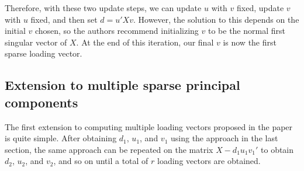 \documentclass[11pt]{article}
\begin{document}
Therefore, with these two update steps, we can update $u$ with $v$ fixed, update $v$ with $u$ fixed, and then set $d = u'Xv$. However, the solution to this depends on the initial $v$ chosen, so the authors recommend initializing $v$ to be the normal first singular vector of $X$. At the end of this iteration, our final $v$ is now the first sparse loading vector.

\subsection{Extension to multiple sparse principal components}
The first extension to computing multiple loading vectors proposed in the paper is quite simple. After obtaining $d_1$, $u_1$, and $v_1$ using the approach in the last section, the same approach can be repeated on the matrix $X - d_1 u_1 v_1'$  to obtain $d_2$, $u_2$, and $v_2$, and so on until a total of $r$ loading vectors are obtained.
\end{document}
